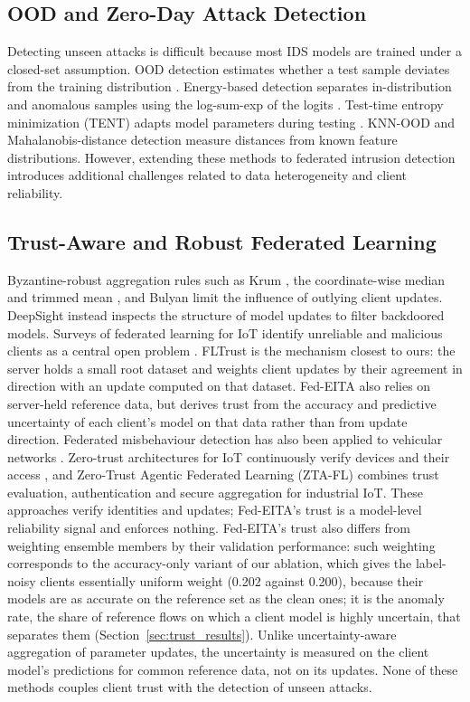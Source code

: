 \documentclass[pdflatex,sn-mathphys-num]{sn-jnl}
\newcommand{\Rtwo}{\color{blue}}
\begin{document}
{\subsection{OOD and Zero-Day Attack Detection}
Detecting unseen attacks is difficult because most IDS models are trained under a closed-set assumption. OOD detection estimates whether a test sample deviates from the training distribution \cite{geng2021openset,yang2024oodsurvey}. Energy-based detection separates in-distribution and anomalous samples using the log-sum-exp of the logits \cite{liu2020energy}. Test-time entropy minimization (TENT) adapts model parameters during testing \cite{wang2021tent}. KNN-OOD \cite{sun2022knn} and Mahalanobis-distance detection \cite{lee2018mahalanobis} measure distances from known feature distributions. However, extending these methods to federated intrusion detection introduces additional challenges related to data heterogeneity and client reliability.
{\color{black}
\subsection{Trust-Aware and Robust Federated Learning}
Byzantine-robust aggregation rules such as Krum \cite{blanchard2017machine}, the coordinate-wise median and trimmed mean \cite{yin2018byzantine}, and Bulyan \cite{mhamdi2018hidden} limit the influence of outlying client updates. DeepSight \cite{rieger2022deepsight} instead inspects the structure of model updates to filter backdoored models. Surveys of federated learning for IoT identify unreliable and malicious clients as a central open problem \cite{nguyen2021federated}. FLTrust \cite{cao2021fltrust} is the mechanism closest to ours: the server holds a small root dataset and weights client updates by their agreement in direction with an update computed on that dataset. Fed-EITA also relies on server-held reference data, but derives trust from the accuracy and predictive uncertainty of each client's model on that data rather than from update direction. Federated misbehaviour detection has also been applied to vehicular networks \cite{vinita2023federated}. Zero-trust architectures for IoT continuously verify devices and their access \cite{ijbas2025zerotrust}, and Zero-Trust Agentic Federated Learning (ZTA-FL) \cite{singh2025ztafl} combines trust evaluation, authentication and secure aggregation for industrial IoT. These approaches verify identities and updates; Fed-EITA's trust is a model-level reliability signal and enforces nothing. {\Rtwo Fed-EITA's trust also differs from weighting ensemble members by their validation performance: such weighting corresponds to the accuracy-only variant of our ablation, which gives the label-noisy clients essentially uniform weight (0.202 against 0.200), because their models are as accurate on the reference set as the clean ones; it is the anomaly rate, the share of reference flows on which a client model is highly uncertain, that separates them (Section~\ref{sec:trust_results}). Unlike uncertainty-aware aggregation of parameter updates, the uncertainty is measured on the client model's predictions for common reference data, not on its updates.} None of these methods couples client trust with the detection of unseen attacks.}
}
\end{document}
